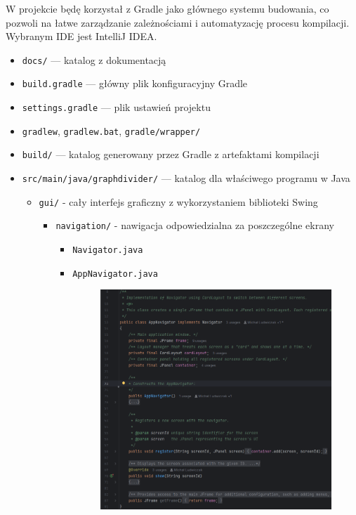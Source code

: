 \documentclass{article}
\begin{document}
    W projekcie będę korzystał z Gradle jako głównego systemu budowania, co pozwoli na łatwe zarządzanie zależnościami i automatyzację procesu kompilacji. Wybranym IDE jest IntelliJ IDEA.
    
    \begin{itemize}
        \item \texttt{docs/} — katalog z dokumentacją
        \item \texttt{build.gradle} — główny plik konfiguracyjny Gradle
        \item \texttt{settings.gradle} — plik ustawień projektu
        \item \texttt{gradlew}, \texttt{gradlew.bat}, \texttt{gradle/wrapper/}
        \item \texttt{build/} — katalog generowany przez Gradle z artefaktami kompilacji
        \item \texttt{src/main/java/graphdivider/} — katalog dla właściwego programu w Java
          \begin{itemize}
              \item \texttt{gui/} - cały interfejs graficzny z wykorzystaniem biblioteki Swing
                    \begin{itemize}
                        \item \texttt{navigation/} - nawigacja odpowiedzialna za poszczególne ekrany
                            \begin{itemize}
                                 \item \texttt{Navigator.java}
                                 \item \texttt{AppNavigator.java}
                                 \begin{figure}[H]
                                        \centering
                                        \includegraphics[width=0.9\linewidth]{img/appnavigator.png}

\end{figure}
\end{itemize}
\end{itemize}
\end{itemize}
\end{itemize}
\end{document}

